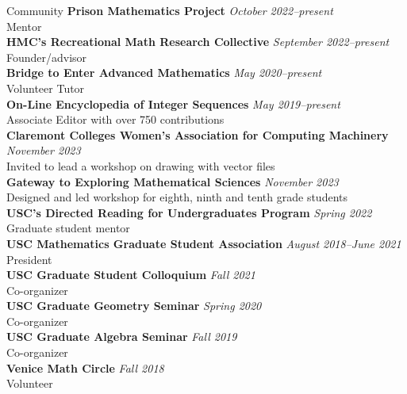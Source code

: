 \documentclass{cv} %
\begin{document}
\begin{rSection}{Community}
  \textbf{Prison Mathematics Project} \hfill \textit{October 2022--present}\\
  Mentor \\
  \textbf{HMC's Recreational Math Research Collective} \hfill \textit{September 2022--present}\\
  Founder/advisor \\
  \textbf{Bridge to Enter Advanced Mathematics} \hfill \textit{May 2020--present}\\
  Volunteer Tutor \\
  \textbf{On-Line Encyclopedia of Integer Sequences} \hfill \textit{May 2019--present}\\
  Associate Editor with over 750 contributions \\
  \textbf{Claremont Colleges Women's Association for Computing Machinery} \hfill \textit{November 2023}\\
  Invited to lead a workshop on drawing with vector files\\
  \textbf{Gateway to Exploring Mathematical Sciences} \hfill \textit{November 2023}\\
  Designed and led workshop for eighth, ninth and tenth grade students\\
  \textbf{USC's Directed Reading for Undergraduates Program} \hfill \textit{Spring 2022}\\
  Graduate student mentor \\
  \textbf{USC Mathematics Graduate Student Association} \hfill \textit{August 2018--June 2021}\\
  President \\
  \textbf{USC Graduate Student Colloquium} \hfill \textit{Fall 2021}\\
  Co-organizer \\
  \textbf{USC Graduate Geometry Seminar} \hfill \textit{Spring 2020}\\
  Co-organizer \\
  \textbf{USC Graduate Algebra Seminar} \hfill \textit{Fall 2019}\\
  Co-organizer\\
  \textbf{Venice Math Circle} \hfill \textit{Fall 2018}\\
  Volunteer
\end{rSection}
\end{document}
